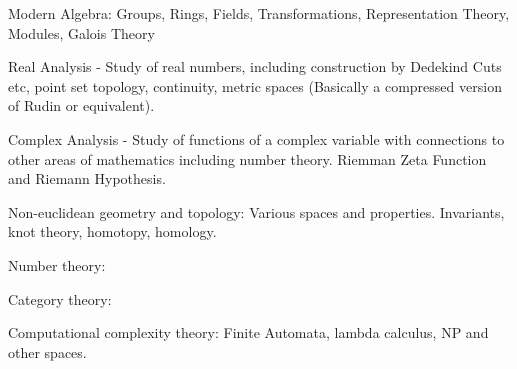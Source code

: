 \documentclass{book}
\begin{document}
    Modern Algebra:  Groups, Rings, Fields, Transformations, Representation Theory, Modules, Galois Theory

    Real Analysis - Study of real numbers, including construction by Dedekind Cuts etc, point set topology, continuity, metric spaces (Basically a compressed version of Rudin or equivalent).

    Complex Analysis - Study of functions of a complex variable with connections to other areas of mathematics including number theory.  Riemman Zeta Function and Riemann Hypothesis.

    Non-euclidean geometry and topology:  Various spaces and properties.  Invariants, knot theory, homotopy, homology.

    Number theory:

    Category theory:

    Computational complexity theory:  Finite Automata, lambda calculus, NP and other spaces.
    
\tableofcontents












\printindex
\end{document}
